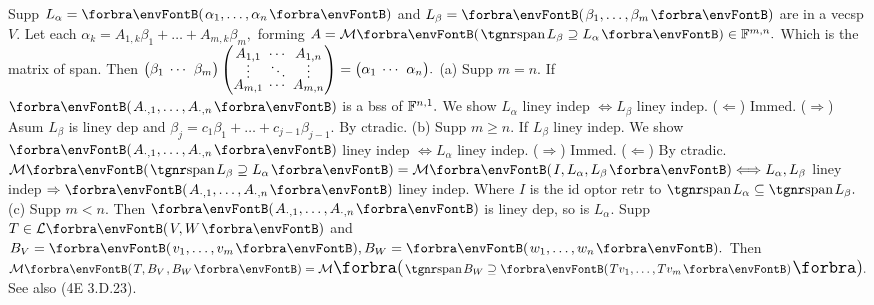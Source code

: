 \ChEnd

\vfill{}

\vspace{8pt}

\BulletPointX\NoteFor{[3.30, 32]}\;\TextB{}
Supp $L_{\alpha}=\Par{\alpha_1,\dots,\alpha_n}$ and $L_{\beta}=\Par{\beta_1,\dots,\beta_m}$ are in a vecsp $V.$\TextB{}
Let each $\alpha_k=A_{1,k}\beta_1+\dots+A_{m,k}\beta_m,$ forming $A=\Mt{\spn L_\beta\supseteq L_{\alpha}}\in\Fbb^{m,n}.$\TextB{\vspace{3pt}}
Which is {\tgsl the matrix of span}. \;Then ${\normalsize\begin{pmatrix}\beta_1 &\hspace{-6pt} \cdots &\hspace{-6pt} \beta_m\end{pmatrix}\begin{pmatrix}
	A_{1,1} &\hspace{-6pt} \cdots &\hspace{-6pt} A_{1,n}\\[-4pt]
	\vdots	&\hspace{-6pt} \ddots &\hspace{-6pt} \vdots \\[-4pt]
	A_{m,1} &\hspace{-6pt} \cdots &\hspace{-6pt} A_{m,n}
\end{pmatrix}}={\normalsize\begin{pmatrix}\alpha_1 &\hspace{-6pt} \cdots &\hspace{-6pt} \alpha_n\end{pmatrix}}.$\TextB{\vspace{6pt}}
(a) Supp $m=n.$ If $\Par{A_{\cdot,1},\dots,A_{\cdot,n}}$ is a bss of ${\mathbb{F}}^{n,1}.$ We show $L_{\alpha}$ liney indep $\Longleftrightarrow L_{\beta}$ liney indep.\TextB{}
\Ha ($\Leftarrow$) Immed. ($\Rightarrow$) Asum $L_{\beta}$ is liney dep and $\beta_j=c_1\beta_1+\dots+c_{j-1}\beta_{j-1}.$ By ctradic.\PfEnd\vspace{2pt}\TextB{}
(b) Supp $m\geqslant n.$ If $L_{\beta}$ liney indep. We show $\Par{A_{\cdot,1},\dots,A_{\cdot,n}}$ liney indep $\Longleftrightarrow L_{\alpha}$ liney indep.\TextB{}
\Hb ($\Rightarrow$) Immed. ($\Leftarrow$) By ctradic.\PfEnd\TextB{}
\Hb\AComm $\Mt{\spn L_{\beta}\supseteq L_\alpha}=\Mt{I,L_{\alpha},L_{\beta}}\Longleftrightarrow L_{\alpha},L_{\beta}$ liney indep $\Rightarrow\Par{A_{\cdot,1},\dots,A_{\cdot,n}}$ liney indep.\parCom{\Hb\IndentB}
Where $I$ is the id optor retr to $\spn L_{\alpha}\subseteq\spn L_{\beta}.$
\vspace{3pt}\TextB{}
(c) Supp $m<n.$ Then $\Par{A_{\cdot,1},\dots,A_{\cdot,n}}$ is liney dep, so is $L_{\alpha}.$\TextB{\vspace{5pt}}
Supp $T\in\Lm{V,W}$ and $B_V=\Par{v_1,\dots,v_m},B_W=\Par{w_1,\dots,w_n}.$\TextB{}
Then $\Mt{T,B_V\hspace{1pt},B_W}=\Mt[\BigPar]{\spn B_W\supseteq\Par{Tv_1,\dots,Tv_m}}.$ \; \AComm See also (4E 3.D.23).
\SepLine

